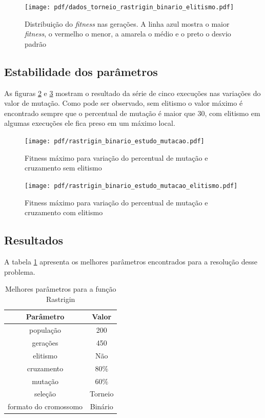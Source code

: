\documentclass[conference]{IEEEtran}
\begin{document}
\begin{figure}[h]
        \centering
        \texttt{[image: pdf/dados\_torneio\_rastrigin\_binario\_elitismo.pdf]}%
        \caption{Distribuição do \textit{fitness} nas gerações. A linha azul mostra o maior \textit{fitness}, o vermelho o menor, a amarela o médio e o preto o desvio padrão}
        \label{fig:dadosTorneioRastriginBinario}
\end{figure}

\subsection{Estabilidade dos parâmetros}

As figuras \ref{fig:rastrigin:mut_cross} e \ref{fig:rastrigin:mut_cross_elit} mostram o resultado da série de cinco execuções nas variações do valor de mutação. Como pode ser observado, sem elitismo o valor máximo é encontrado sempre que o percentual de mutação é maior que $30$, com elitismo em algumas execuções ele fica preso em um máximo local.

\begin{figure}[th]
        \centering
        \texttt{[image: pdf/rastrigin\_binario\_estudo\_mutacao.pdf]}
        \caption{Fitness máximo para variação do percentual de mutação e cruzamento sem elitismo}
        \label{fig:rastrigin:mut_cross}
\end{figure}

\begin{figure}[th]
        \centering
        \texttt{[image: pdf/rastrigin\_binario\_estudo\_mutacao\_elitismo.pdf]}
        \caption{Fitness máximo para variação do percentual de mutação e cruzamento com elitismo}
        \label{fig:rastrigin:mut_cross_elit}
\end{figure}

\subsection{Resultados}

A tabela \ref{tab:melhor_parametros_rastrigin} apresenta os melhores parâmetros encontrados para a resolução desse problema.

\begin{table}[h]
\renewcommand{\arraystretch}{1.3}
\caption{Melhores parâmetros para a função Rastrigin}
\label{tab:melhor_parametros_rastrigin}
\centering
\begin{tabular}{c|c}
\hline
Parâmetro & Valor\\
\hline
população & 200 \\
gerações & 450 \\
elitismo & Não \\
cruzamento & $80\%$ \\
mutação & $60\%$ \\
seleção & Torneio \\
formato do cromossomo & Binário \\
\end{tabular}
\end{table}
\end{document}
